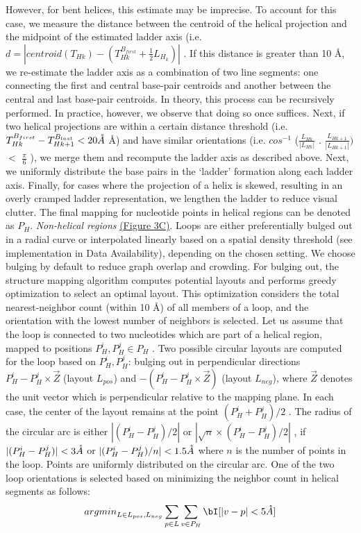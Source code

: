 However, for bent helices, this estimate may be imprecise. To account for this case, we measure the distance
 between the centroid of the helical projection and the midpoint of the estimated ladder axis (i.e. $d = |centroid(T_{Hk}) - (T_{Hk}^{B_{first}} + \frac{1}{2}L_{H_k})|$
. If this distance is greater than 10 \AA, we re-estimate the ladder axis as a combination of two line segments: one connecting the first and central base-pair centroids and another between the central and last base-pair centroids. In theory, this process can be recursively performed. In practice, however, we observe that doing so once suffices. Next, if two helical projections are within a certain distance threshold (i.e. $T_{Hk}^{B_{first}} - T_{Hk+1}^{B_{last}} < 20 \AA$
Å) and have similar orientations (i.e. 
$cos^{-1}$ 
($\frac{L_{Hk}}{|L_{Hk}|}$ 
$.$ 
$\frac{L_{H{k+1}}}{|L_{H{k+1}}|})$ 
$<$ 
$\frac{\pi}{6}$
), we merge them and recompute the ladder axis as described above. Next, we uniformly distribute the base pairs in the ‘ladder’ formation along each ladder axis. Finally, for cases where the projection of a helix is skewed, resulting in an overly cramped ladder representation, we lengthen the ladder to reduce visual clutter. The final mapping for nucleotide points in helical regions can be denoted as $P_H$.
\textit{Non-helical regions} \hyperref[fig:rnascape3]{(Figure 3C)}. Loops are either preferentially bulged out in a radial curve or interpolated linearly based on a spatial density threshold (see implementation in Data Availability), depending on the chosen setting. We choose bulging by default to reduce graph overlap and crowding. For bulging out, the structure mapping algorithm computes potential layouts and performs greedy optimization to select an optimal layout. This optimization considers the total nearest-neighbor count (within 10 \AA) of all members of a loop, and the orientation with the lowest number of neighbors is selected. Let us assume that the loop is connected to two nucleotides which are part of a helical region, mapped to positions $P_H^i, P_H^j \in P_H$ . Two possible circular layouts are computed for the loop based on $P_H^i, P_H^j$: bulging out in perpendicular directions $P_H^i - P_H^j\times \vec{Z}$
(layout $L_{pos}$) and $-(P_H^i - P_H^j\times \vec{Z})$ 
(layout $L_{neg}$), where $\vec{Z}$
denotes the unit vector which is perpendicular relative to the mapping plane. In each case, the center of the layout remains at the point $(P_H^i + P_H^j)/2$
. The radius of the circular arc is either $|(P_H^i - P_H^j)/2|$ or $|\sqrt{n}\times(P_H^i - P_H^j)/2|$
, if $|(P_H^i - P_H^j)| < 3 \AA$ or $|(P_H^i - P_H^j)/n| < 1.5 \AA$
where $n$ is the number of points in the loop. Points are uniformly distributed on the circular arc. One of the two loop orientations is selected based on minimizing the neighbor count in helical segments as follows:
\begin{align}
{argmin}_{L\in{L_{pos},L_{neg}}}\sum\limits_{p\in L}\sum\limits_{v\in P_H}\bI[|v-p| < 5 \AA]
\end{align}


